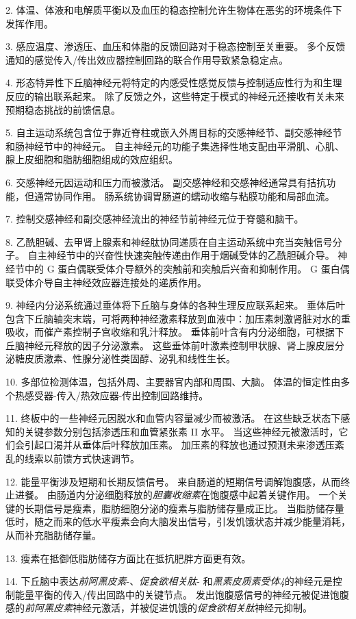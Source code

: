 2. 体温、体液和电解质平衡以及血压的稳态控制允许生物体在恶劣的环境条件下发挥作用。


3. 感应温度、渗透压、血压和体脂的反馈回路对于稳态控制至关重要。
多个反馈通知的感觉传入/传出效应器控制回路的联合作用导致紧急稳定点。


4. 形态特异性下丘脑神经元将特定的内感受性感觉反馈与控制适应性行为和生理反应的输出联系起来。
除了反馈之外，这些特定于模式的神经元还接收有关未来预期稳态挑战的前馈信息。


5. 自主运动系统包含位于靠近脊柱或嵌入外周目标的交感神经节、副交感神经节和肠神经节中的神经元。
自主神经元的功能子集选择性地支配由平滑肌、心肌、腺上皮细胞和脂肪细胞组成的效应组织。


6. 交感神经元因运动和压力而被激活。
副交感神经和交感神经通常具有拮抗功能，但通常协同作用。
肠系统协调胃肠道的蠕动收缩与粘膜功能和局部血流。


7. 控制交感神经和副交感神经流出的神经节前神经元位于脊髓和脑干。


8. 乙酰胆碱、去甲肾上腺素和神经肽协同递质在自主运动系统中充当突触信号分子。
自主神经节中的兴奋性快速突触传递由作用于烟碱受体的乙酰胆碱介导。
神经节中的 G 蛋白偶联受体介导额外的突触前和突触后兴奋和抑制作用。
G 蛋白偶联受体介导自主神经效应器连接处的递质作用。 


9. 神经内分泌系统通过垂体将下丘脑与身体的各种生理反应联系起来。
垂体后叶包含下丘脑轴突末端，可将两种神经激素释放到血液中：加压素刺激肾脏对水的重吸收，而催产素控制子宫收缩和乳汁释放。
垂体前叶含有内分泌细胞，可根据下丘脑神经元释放的因子分泌激素。
这些垂体前叶激素控制甲状腺、肾上腺皮层分泌糖皮质激素、性腺分泌性类固醇、泌乳和线性生长。


10. 多部位检测体温，包括外周、主要器官内部和周围、大脑。
体温的恒定性由多个热感受器-传入/热效应器-传出控制回路维持。


11. 终板中的一些神经元因脱水和血管内容量减少而被激活。
在这些缺乏状态下感知的关键参数分别包括渗透压和血管紧张素 II 水平。
当这些神经元被激活时，它们会引起口渴并从垂体后叶释放加压素。
加压素的释放也通过预测未来渗透压紊乱的线索以前馈方式快速调节。 


12. 能量平衡涉及短期和长期反馈信号。
来自肠道的短期信号调解饱腹感，从而终止进餐。
由肠道内分泌细胞释放的\textit{胆囊收缩素}在饱腹感中起着关键作用。
一个关键的长期信号是瘦素，脂肪细胞分泌的瘦素与脂肪储存量成正比。
当脂肪储存量低时，随之而来的低水平瘦素会向大脑发出信号，引发饥饿状态并减少能量消耗，从而补充脂肪储存量。 


13. 瘦素在抵御低脂肪储存方面比在抵抗肥胖方面更有效。 


14. 下丘脑中表达\textit{前阿黑皮素}-、\textit{促食欲相关肽}- 和\textit{黑素皮质素受体4}的神经元是控制能量平衡的传入/传出回路中的关键节点。
发出饱腹感信号的神经元被促进饱腹感的\textit{前阿黑皮素}神经元激活，并被促进饥饿的\textit{促食欲相关肽}神经元抑制。


